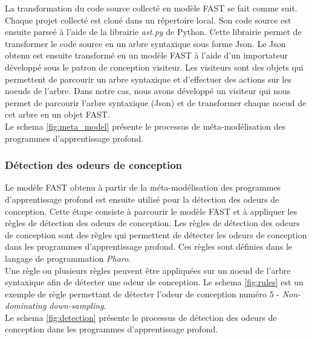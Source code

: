 La transformation du code source collecté en modèle FAST se fait comme suit.
Chaque projet collecté est cloné dans un répertoire local. Son code source est
ensuite parseé à l'aide de la librairie \emph{ast.py} de Python. Cette librairie
permet de transformer le code source en un arbre syntaxique sous forme Json. Le
Json obtenu est ensuite transformé en un modèle FAST à l'aide d'un importateur
développé sous le patron de conception visiteur. Les visiteurs sont des objets
qui permettent de parcourir un arbre syntaxique et d'effectuer des actions sur
les noeuds de l'arbre. Dans notre cas, nous avons développé un visiteur qui nous
permet de parcourir l'arbre syntaxique (Json) et de transformer chaque noeud de
cet arbre en un objet FAST.\\

Le schema \ref{fig:meta_model} présente le processus de méta-modélisation des
programmes d'apprentissage profond.\\

\subsubsection{Détection des odeurs de conception}
\label{sec:Détection des odeurs de conception}
Le modèle FAST obtenu à partir de la méta-modélisation des programmes
d'apprentissage profond est ensuite utilisé pour la détection des odeurs de
conception. Cette étape consiste à parcourir le modèle FAST et à appliquer les
règles de détection des odeurs de conception. Les règles de détection des odeurs
de conception sont des règles qui permettent de détecter les odeurs de
conception dans les programmes d'apprentissage profond. Ces règles sont définies
dans le langage de programmation \emph{Pharo}.\\ Une règle ou plusieurs règles
peuvent être appliquées sur un noeud de l'arbre syntaxique afin de détecter une
odeur de conception. Le schema \ref{fig:rules} est un exemple de règle
permettant de détecter l'odeur de conception numéro 5 - \emph{Non-dominating down-sampling}.\\
Le schema \ref{fig:detection} présente le processus de détection des odeurs de conception dans les programmes d'apprentissage profond.\\


